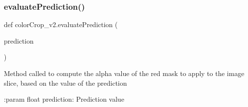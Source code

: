 \subsubsection{\texorpdfstring{evaluate\+Prediction()}{evaluatePrediction()}}
{\footnotesize\ttfamily def color\+Crop\+\_\+v2.\+evaluate\+Prediction (\begin{DoxyParamCaption}\item[{}]{prediction }\end{DoxyParamCaption})}

\begin{DoxyVerb}Method called to compute the alpha value of the red mask to apply to the image slice, based on the value of the prediction

:param float prediction: Prediction value
\end{DoxyVerb}
 